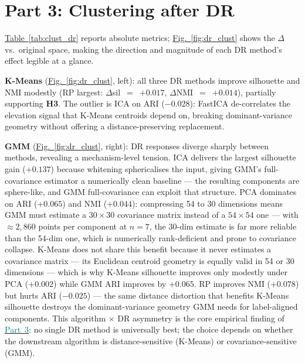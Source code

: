 \documentclass[conference]{IEEEtran}
\newcommand{\figref}[1]{\hyperref[#1]{\textcolor{denim_comp}{Fig.~\ref*{#1}}}}
\newcommand{\tabref}[1]{\hyperref[#1]{\textcolor{sage}{Table~\ref*{#1}}}}
\newcommand{\partref}[2]{\hyperref[#2]{\textcolor{teal}{Part~#1}}}
\begin{document}
\section{Part 3: Clustering after DR}\label{sec:p3}

\tabref{tab:clust_dr} reports absolute metrics; \figref{fig:dr_clust}
shows the $\Delta$ vs.\ original space, making the direction and magnitude
of each DR method's effect legible at a glance.

\textbf{K-Means} (\figref{fig:dr_clust}, left): all three DR methods improve
silhouette and NMI modestly (RP largest: $\Delta$sil~$=$~$+0.017$,
$\Delta$NMI~$=$~$+0.014$), partially supporting \textbf{H3}.
The outlier is ICA on ARI ($-0.028$): FastICA de-correlates the elevation
signal that K-Means centroids depend on, breaking dominant-variance geometry
without offering a distance-preserving replacement.

\textbf{GMM} (\figref{fig:dr_clust}, right): DR responses diverge sharply
between methods, revealing a mechanism-level tension.
ICA delivers the largest silhouette gain ($+0.137$) because whitening
sphericalises the input, giving GMM's full-covariance estimator a
numerically clean baseline --- the resulting components are
sphere-like, and GMM full-covariance can exploit that structure.
PCA dominates on ARI ($+0.065$) and NMI ($+0.044$): compressing 54 to 30
dimensions means GMM must estimate a $30{\times}30$ covariance matrix
instead of a $54{\times}54$ one --- with ${\approx}2{,}860$ points per
component at $n{=}7$, the 30-dim estimate is far more reliable than the
54-dim one, which is numerically rank-deficient and prone to covariance
collapse.
K-Means does not share this benefit because it never estimates a covariance
matrix --- its Euclidean centroid geometry is equally valid in 54 or 30
dimensions --- which is why K-Means silhouette improves only modestly
under PCA ($+0.002$) while GMM ARI improves by $+0.065$.
RP improves NMI ($+0.078$) but hurts ARI ($-0.025$) --- the same
distance distortion that benefits K-Means silhouette destroys the
dominant-variance geometry GMM needs for label-aligned components.
This algorithm $\times$ DR asymmetry is the core empirical finding of
\partref{3}{sec:p3}: no single DR method is universally best; the choice depends on
whether the downstream algorithm is distance-sensitive (K-Means) or
covariance-sensitive (GMM).
\end{document}
